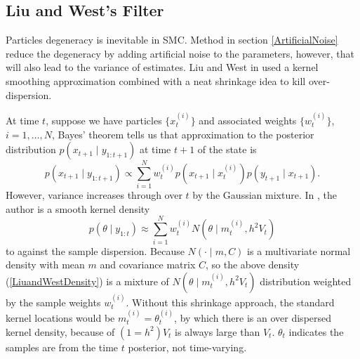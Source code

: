 





\subsection{Liu and West's Filter}

Particles degeneracy is inevitable in SMC. Method in section \ref{ArtificialNoise} reduce the degeneracy by adding artificial noise to the parameters, however, that will also lead to the variance of estimates. Liu and West in \cite{liu2001combined} used a kernel smoothing approximation combined with a neat shrinkage idea to kill over-dispersion. 

At time $t$, suppose we have particles $\{x_t^{(i)}\}$ and associated weights $\{w_t^{(i)}\}$, $i=1,\dots,N$, Bayes' theorem tells us that approximation to the posterior distribution $p(x_{t+1}\mid y_{1:t+1})$ at time $t+1$ of the state is 
\begin{equation*}
p(x_{t+1} \mid y_{1:t+1}) \propto \sum_{i=1}^{N} w_t^{(i)} p(x_{t+1} \mid x_t^{(i)})p(y_{t+1}\mid x_{t+1}).
\end{equation*}
However, variance increases through over $t$ by the Gaussian mixture. In \cite{west1993mixture}, the author is a smooth kernel density 
\begin{equation}\label{LiuandWestDensity}
p(\theta\mid y_{1:t})\approx \sum_{i=1}^{N}w_t^{(i)} N(\theta\mid m_t^{(i)},h^2V_t)
\end{equation}
to against the sample dispersion. Because $N(\cdot\mid m,C)$ is a multivariate normal density with mean $m$ and covariance matrix $C$, so the above density (\ref{LiuandWestDensity}) is a mixture of $N(\theta\mid m_t^{(i)},h^2V_t)$ distribution weighted by the sample weights $w_t^{(i)}$. Without this shrinkage approach, the standard kernel locations would be $m_t^{(i)}=\theta_t^{(i)}$, by which there is an over dispersed kernel density, because of $(1=h^2)V_t$ is always large than $V_t$. $\theta_t$ indicates the samples are from the time $t$ posterior, not time-varying. 

